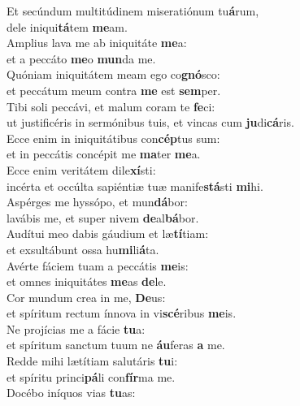\evenverse Et secúndum multitúdinem miseratiónum tu\textbf{á}rum,~\*\\
\evenverse dele iniqui\textbf{tá}tem \textbf{me}am.\\
\oddverse Amplius lava me ab iniquitáte \textbf{me}a:~\*\\
\oddverse et a peccáto \textbf{me}o \textbf{mun}da me.\\
\evenverse Quóniam iniquitátem meam ego co\textbf{gnó}sco:~\*\\
\evenverse et peccátum meum contra \textbf{me} est \textbf{sem}per.\\
\oddverse Tibi soli peccávi, et malum coram te \textbf{fe}ci:~\*\\
\oddverse ut justificéris in sermónibus tuis, et vincas cum \textbf{ju}di\textbf{cá}ris.\\
\evenverse Ecce enim in iniquitátibus con\textbf{cép}tus sum:~\*\\
\evenverse et in peccátis concépit me \textbf{ma}ter \textbf{me}a.\\
\oddverse Ecce enim veritátem dile\textbf{xí}sti:~\*\\
\oddverse incérta et occúlta sapiéntiæ tuæ manife\textbf{stá}sti \textbf{mi}hi.\\
\evenverse Aspérges me hyssópo, et mun\textbf{dá}bor:~\*\\
\evenverse lavábis me, et super nivem \textbf{de}al\textbf{bá}bor.\\
\oddverse Audítui meo dabis gáudium et læ\textbf{tí}tiam:~\*\\
\oddverse et exsultábunt ossa hu\textbf{mi}li\textbf{á}ta.\\
\evenverse Avérte fáciem tuam a peccátis \textbf{me}is:~\*\\
\evenverse et omnes iniquitátes \textbf{me}as \textbf{de}le.\\
\oddverse Cor mundum crea in me, \textbf{De}us:~\*\\
\oddverse et spíritum rectum ínnova in vi\textbf{scé}ribus \textbf{me}is.\\
\evenverse Ne projícias me a fácie \textbf{tu}a:~\*\\
\evenverse et spíritum sanctum tuum ne \textbf{áu}feras \textbf{a} me.\\
\oddverse Redde mihi lætítiam salutáris \textbf{tu}i:~\*\\
\oddverse et spíritu princi\textbf{pá}li con\textbf{fír}ma me.\\
\evenverse Docébo iníquos vias \textbf{tu}as:~\*\\
